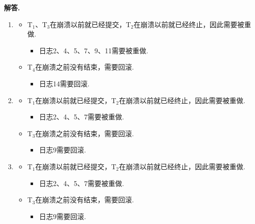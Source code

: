 \documentclass[12pt, oneside]{ctexart}
\numberwithin{figure}{section}
\numberwithin{table}{section}
\newenvironment{solution}{\par\noindent\textbf{解答. }}{\par}
\begin{document}
\begin{solution}
\begin{enumerate}[(1)]
    \item
        \begin{itemize}
            \item T$_1$、T$_3$在崩溃以前就已经提交，T$_2$在崩溃以前就已经终止，因此需要被重做.
                \begin{itemize}
                    \item 日志2、4、5、7、9、11需要被重做.
                \end{itemize}
            \item T$_4$在崩溃之前没有结束，需要回滚.
                \begin{itemize}
                    \item 日志14需要回滚.
                \end{itemize}
        \end{itemize}
    \item 
        \begin{itemize}
            \item T$_1$在崩溃以前就已经提交，T$_2$在崩溃以前就已经终止，因此需要被重做.
                \begin{itemize}
                    \item 日志2、4、5、7需要被重做.
                \end{itemize}
            \item T$_3$在崩溃之前没有结束，需要回滚.
                \begin{itemize}
                    \item 日志9需要回滚.
                \end{itemize}
        \end{itemize}
    \item 
        \begin{itemize}
            \item T$_1$在崩溃以前就已经提交，T$_2$在崩溃以前就已经终止，因此需要被重做.
                \begin{itemize}
                    \item 日志2、4、5、7需要被重做.
                \end{itemize}
            \item T$_3$在崩溃之前没有结束，需要回滚.
                \begin{itemize}
                    \item 日志9需要回滚.
                \end{itemize}

\end{itemize}
\end{enumerate}
\end{solution}
\end{document}
